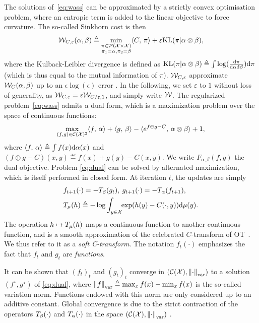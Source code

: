 The solutions of~\eqref{eq:wass} can be approximated by a strictly convex optimisation problem, where an entropic term is added to the linear objective to force curvature. The so-called Sinkhorn cost is then
\begin{equation}\label{eq:wass}
    \mathcal{W}_{C,\varepsilon}(\alpha, \beta) \triangleq 
    \min_{
    \substack{
        \pi \in \mathcal{P}(\mathcal{X} \times \mathcal{X})
        \\\pi_1 = \alpha, \pi_2 = \beta
    }    
    } \langle C,\,\pi\rangle + \varepsilon \textrm{KL}(\pi | \alpha \otimes \beta),
\end{equation}
where the Kulback-Leibler divergence is defined as $\textrm{KL}(\pi | \alpha \otimes
\beta) \triangleq \int \log(\frac{\textrm{d}\pi}{\textrm{d}\alpha\textrm{d}\beta}) \textrm{d}\pi$ (which is thus equal to
the mutual information of $\pi$).
%
$\mathcal{W}_{C,\varepsilon}$ approximate $\mathcal{W}_C(\alpha,\beta)$ up to an $\epsilon
\log(\epsilon)$ error \citep{2019-Genevay-aistats}. In the following, we set
$\varepsilon$ to $1$ without loss of generality, as $\mathcal{W}_{C, \varepsilon} =
\varepsilon \mathcal{W}_{C / \varepsilon, 1}$, and simply write $\mathcal{W}$.
%
The regularized problem~\eqref{eq:wass} admits a dual form, which is a maximization problem over the space of continuous functions:
\begin{equation}\label{eq:dual}
    \max_{(f, g) \in \mathcal{C}(\mathcal{X})^2} \langle f,\,\alpha\rangle + 
    \langle g,\,\beta\rangle
    - \langle e^{f \oplus g - C},\,\alpha \otimes \beta\rangle + 1, 
\end{equation}
where $\langle f,\,\alpha\rangle \triangleq \int f(x) \textrm{d}\alpha(x)$ and $(f \oplus g - C)(x,y)
\eqdef f(x)+g(y)-C(x,y)$. We write $F_{\alpha, \beta}(f, g)$ the dual objective. 
Problem \eqref{eq:dual} can be solved by alternated maximization, which is itself performed in closed form. At iteration $t$, the updates are simply
\begin{align}
    &f_{t+1}(\cdot) = - T_{\beta}(g_t), \:
    g_{t+1}(\cdot) = - T_{\alpha}(f_{t+1}), \\
    &
    T_{\mu}(h) \triangleq 
    - \log \int_{y \in \mathcal{X}}\!\! \exp(h(y) - C(\cdot, y))\textrm{d} \mu(y).\label{eq:sinkhorn}
\end{align}
The operation $h \mapsto T_{\mu}(h)$  maps a continuous function to another continuous function, and is a smooth approximation of the celebrated $C$-transform of OT~\cite{santambrogio2015optimal}. We thus refer to it as a \textit{soft C-transform}. 
%
The notation $f_t(\cdot)$ emphasizes the fact that $f_t$ and $g_t$ are
\textit{functions}. 
%

It can be shown that ${(f_t)}_t$ and ${(g_t)}_t$ converge in $(\mathcal{C}(\mathcal{X}),
\left\| \cdot \right\|_{\text{var}})$ to a solution $(f^\star, g^\star)$ of
\eqref{eq:dual}, where $\left\| f \right\|_{\text{var}} \triangleq \max_x f(x) - \min_x f(x)$
is the so-called variation norm. Functions endowed with this norm are only
considered up to an additive constant.  Global convergence is due to the strict
contraction of the operators $T_{\beta}(\cdot)$ and
$T_{\alpha}(\cdot)$ in the space $(\mathcal{C}(\mathcal{X}), \left\| \cdot \right\|_{\text{var}})$
\citep{lemmens_nonlinear_2012}.

